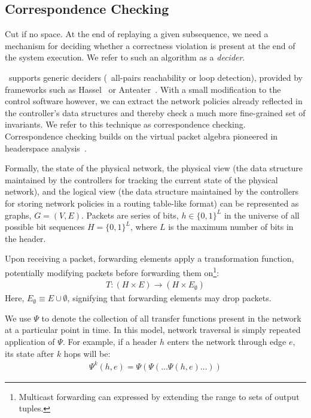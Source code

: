 \subsection{Correspondence Checking}
\label{subsec:cc}

\num{Cut if no space.}
At the end of replaying a given subsequence, we need a mechanism for deciding
whether a correctness violation is present at the end of the system execution.
We refer to such an algorithm as a {\em decider}.

\Simulator~supports generic deciders (\eg~all-pairs reachability or loop detection),
provided by frameworks such as Hassel~\cite{hsa,hsa_realtime} or
Anteater~\cite{anteater,khurshid2012veriflow}.
With a small modification to the control software however, we can
extract the network policies already reflected in the
controller's data structures and thereby check a much more fine-grained set of invariants.
We refer to this technique as correspondence checking. Correspondence checking
builds on the virtual packet algebra
pioneered in headerspace analysis~\cite{hsa}.

Formally, the state of the physical network, the physical view (the
data structure maintained by the controllers for tracking the current state of the physical
network), and the
logical view (the data structure maintained by the controllers for storing
network policies in a routing table-like format) can be represented as graphs,
$G = (V, E)$. Packets are series of bits, $h \in \{0,1\}^L$ in the universe
of all possible bit sequences $H = \{0,1\}^L$,
where $L$ is the maximum number of bits in the header.

Upon receiving a packet,
forwarding elements apply a transformation function, potentially modifying
packets before forwarding them on\footnote{Multicast forwarding can expressed
by extending the range to sets of output tuples.}:
\begin{align*}
T: (H \times E) \rightarrow (H \times E_{\emptyset})
\end{align*}
Here, $E_{\emptyset} \equiv E \cup \emptyset$, signifying that forwarding elements
may drop packets.

We use $\Psi$ to denote the collection of all transfer functions present in
the network at a particular point in time. In this model, network traversal is
simply repeated application of $\Psi$.
For example, if a header $h$ enters the network through edge
$e$, its state after $k$ hops will be:
\begin{align*}
\Psi^k(h,e) = \Psi(\Psi(\dots \Psi(h,e)\dots))
\end{align*}

